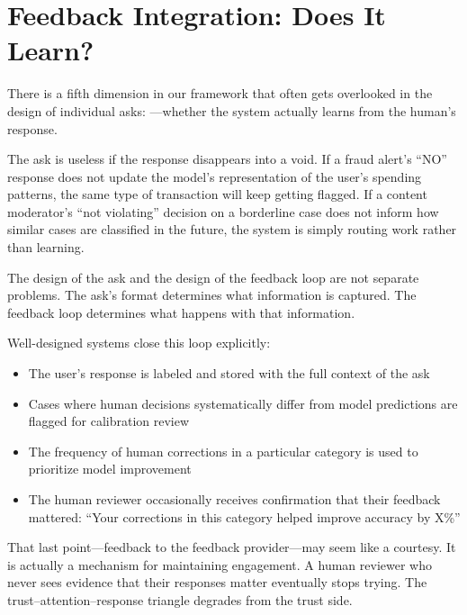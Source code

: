 \section{Feedback Integration: Does It Learn?}
\label{sec:ch05-feedback-integration}

There is a fifth dimension in our framework that often gets overlooked in the design of individual asks: ---whether the system actually learns from the human's response.

The ask is useless if the response disappears into a void. If a fraud alert's ``NO'' response does not update the model's representation of the user's spending patterns, the same type of transaction will keep getting flagged. If a content moderator's ``not violating'' decision on a borderline case does not inform how similar cases are classified in the future, the system is simply routing work rather than learning.

The design of the ask and the design of the feedback loop are not separate problems. The ask's format determines what information is captured. The feedback loop determines what happens with that information.

Well-designed \hitl systems close this loop explicitly:
\begin{itemize}
  \item The user's response is labeled and stored with the full context of the ask
  \item Cases where human decisions systematically differ from model predictions are flagged for calibration review
  \item The frequency of human corrections in a particular category is used to prioritize model improvement
  \item The human reviewer occasionally receives confirmation that their feedback mattered: ``Your corrections in this category helped improve accuracy by X\%''
\end{itemize}

That last point---feedback to the feedback provider---may seem like a courtesy. It is actually a mechanism for maintaining engagement. A human reviewer who never sees evidence that their responses matter eventually stops trying. The trust--attention--response triangle degrades from the trust side.


